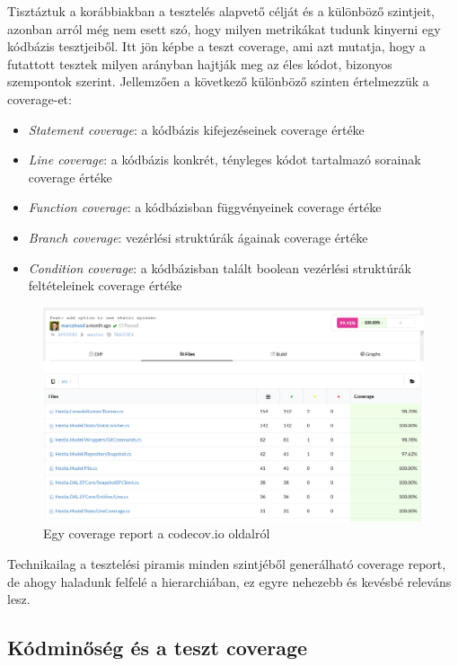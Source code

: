 Tisztáztuk a korábbiakban a tesztelés alapvető célját és a különböző szintjeit, azonban arról még nem esett szó, hogy milyen metrikákat tudunk kinyerni egy kódbázis tesztjeiből. Itt jön képbe a teszt coverage, ami azt mutatja, hogy a futattott tesztek milyen arányban hajtják meg az éles kódot, bizonyos szempontok szerint. Jellemzően a következő különböző szinten értelmezzük a coverage-et:
\begin{itemize}
    \item \textit{Statement coverage}: a kódbázis kifejezéseinek coverage értéke
    \item \textit{Line coverage}: a kódbázis konkrét, tényleges kódot tartalmazó sorainak coverage értéke
    \item \textit{Function coverage}: a kódbázisban függvényeinek coverage értéke
    \item \textit{Branch coverage}: vezérlési struktúrák ágainak coverage értéke
    \item \textit{Condition coverage}: a kódbázisban talált boolean vezérlési struktúrák feltételeinek coverage értéke
\end{itemize}

\begin{figure}[H]
    \centering
    \includegraphics[width=1\textwidth]{images/codecov-report.png}
    \caption{Egy coverage report a codecov.io oldalról}
    \label{fig:codecov-example}
\end{figure}

Technikailag a tesztelési piramis minden szintjéből generálható coverage report, de ahogy haladunk felfelé a hierarchiában, ez egyre nehezebb és kevésbé releváns lesz.

\subsection{Kódminőség és a teszt coverage}

